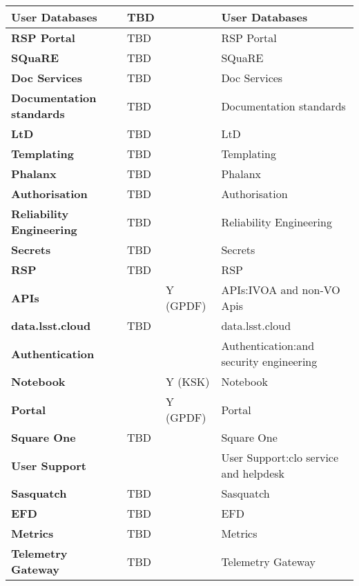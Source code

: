 \begin{longtable} {
|p{}   |p{}|p{} |p{}|}
{\textbf{User Databases}} & TBD &  & User Databases \\ \hline
{\textbf{RSP Portal}} & TBD &  & RSP Portal \\ \hline
{\textbf{SQuaRE}} & TBD &  & SQuaRE \\ \hline
{\textbf{Doc Services}} & TBD &  & Doc Services \\ \hline
{\textbf{Documentation standards}} & TBD &  & Documentation standards \\ \hline
{\textbf{LtD}} & TBD &  & LtD \\ \hline
{\textbf{Templating}} & TBD &  & Templating \\ \hline
{\textbf{Phalanx}} & TBD &  & Phalanx \\ \hline
{\textbf{Authorisation}} & TBD &  & Authorisation \\ \hline
{\textbf{Reliability Engineering}} & TBD &  & Reliability Engineering \\ \hline
{\textbf{Secrets}} & TBD &  & Secrets \\ \hline
{\textbf{RSP}} & TBD &  & RSP \\ \hline
{\textbf{APIs}} &  & Y (GPDF) & APIs:IVOA and non-VO Apis \\ \hline
{\textbf{data.lsst.cloud}} & TBD &  & data.lsst.cloud \\ \hline
{\textbf{Authentication}} &  &  & Authentication:and security engineering \\ \hline
{\textbf{Notebook}} &  & Y (KSK) & Notebook \\ \hline
{\textbf{Portal}} &  & Y (GPDF) & Portal \\ \hline
{\textbf{Square One}} & TBD &  & Square One \\ \hline
{\textbf{User Support}} &  &  & User Support:clo service and helpdesk \\ \hline
{\textbf{Sasquatch}} & TBD &  & Sasquatch \\ \hline
{\textbf{EFD}} & TBD &  & EFD \\ \hline
{\textbf{Metrics}} & TBD &  & Metrics \\ \hline
{\textbf{Telemetry Gateway}} & TBD &  & Telemetry Gateway \\ \hline
\end{longtable}
\normalsize

